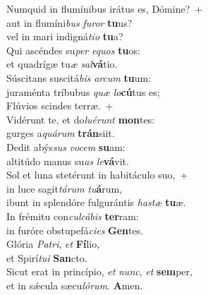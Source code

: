 \evenverse Numquid in flumínibus irátus es, Dómine?~+\\\evenverse  aut in flumíni\textit{bus} \textit{fu}\textit{ror} \textbf{tu}us?~\*\\
\evenverse vel in mari indigná\textit{ti}\textit{o} \textbf{tu}a?\\
\oddverse Qui ascéndes su\textit{per} \textit{e}\textit{quos} \textbf{tu}os:~\*\\
\oddverse et quadrígæ tu\textit{æ} \textit{sal}\textbf{vá}tio.\\
\evenverse Súscitans suscitá\textit{bis} \textit{ar}\textit{cum} \textbf{tu}um:~\*\\
\evenverse juraménta tríbubus \textit{quæ} \textit{lo}\textbf{cú}tus es;\\
\oddverse Flúvios scindes terræ.~+\\
\oddverse  Vidérunt te, et do\textit{lu}\textit{é}\textit{runt} \textbf{mon}tes:~\*\\
\oddverse gurges a\textit{quá}\textit{rum} \textbf{trán}siit.\\
\evenverse Dedit abýs\textit{sus} \textit{vo}\textit{cem} \textbf{su}am:~\*\\
\evenverse altitúdo manus su\textit{as} \textit{le}\textbf{vá}vit.\\
\oddverse Sol et luna stetérunt in habitáculo suo,~+\\
\oddverse  in luce sagit\textit{tá}\textit{rum} \textit{tu}\textbf{á}rum,~\*\\
\oddverse ibunt in splendóre fulgurántis \textit{ha}\textit{stæ} \textbf{tu}æ.\\
\evenverse In frémitu con\textit{cul}\textit{cá}\textit{bis} \textbf{ter}ram:~\*\\
\evenverse in furóre obstupefá\textit{ci}\textit{es} \textbf{Gen}tes.\\
\oddverse Glória \textit{Pa}\textit{tri}, \textit{et} \textbf{Fí}lio,~\*\\
\oddverse et Spirí\textit{tu}\textit{i} \textbf{San}cto.\\
\evenverse Sicut erat in princípio, \textit{et} \textit{nunc}, \textit{et} \textbf{sem}per,~\*\\
\evenverse et in sǽcula sæcu\textit{ló}\textit{rum}. \textbf{A}men.\\
